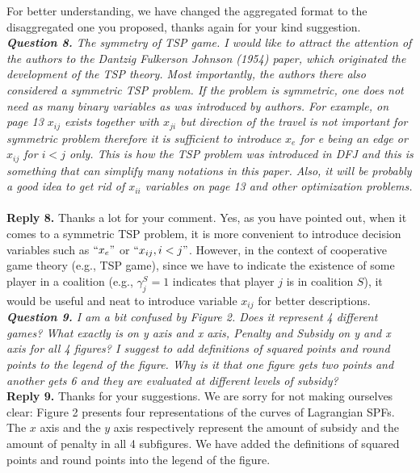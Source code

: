 \documentclass[11pt]{article}
\begin{document}
For better understanding, we have changed the aggregated format to the disaggregated one you proposed, thanks again for your kind suggestion.
\\[4mm]
\noindent \textit{\textbf{Question 8.}
The symmetry of TSP game. I would like to attract the attention of the authors to the Dantzig Fulkerson Johnson (1954) paper, which originated the development of the TSP theory. Most importantly, the authors there also considered a symmetric TSP problem. If the problem is symmetric, one does not need as many binary variables as was introduced by authors. For example, on page 13 $x_{ij}$ exists together with $x_{ji}$ but direction of the travel is not important for symmetric problem therefore it is sufficient to introduce $x_e$ for e being an edge or $x_{ij}$ for $i < j$ only. This is how the TSP problem was introduced in DFJ and this is something that can simplify many notations in this paper. Also, it will be probably a good idea to get rid of $x_{ii}$ variables on page 13 and other optimization problems.}
~\\[2mm]
\noindent \textbf{Reply 8.}
Thanks a lot for your comment.
Yes, as you have pointed out, when it comes to a symmetric TSP problem, it is more convenient to introduce decision variables such as $``x_e"$ or $``x_{ij}, i<j"$.
However, in the context of cooperative game theory (e.g., TSP game), since we have to indicate the existence of some player in a coalition (e.g., $\gamma^{S}_j=1$ indicates that player $j$ is in coalition $S$), it would be useful and neat to introduce variable $x_{ij}$ for better descriptions.
\\[4mm]
\noindent \textit{\textbf{Question 9.}
I am a bit confused by Figure 2. Does it represent 4 different games? What exactly is on y axis and x axis, Penalty and Subsidy on y and x axis for all 4 figures? I suggest to add definitions of squared points and round points to the legend of the figure. Why is it that one figure gets two points and another gets 6 and they are evaluated at different levels of subsidy?}
~\\[2mm]
\noindent \textbf{Reply 9.}
Thanks for your suggestions.
We are sorry for not making ourselves clear:
Figure 2 presents four representations of the curves of Lagrangian SPFs. The $x$ axis and the $y$ axis respectively represent the amount of subsidy and the amount of penalty in all 4 subfigures. We have added the definitions of squared points and round points into the legend of the figure.
\end{document}

